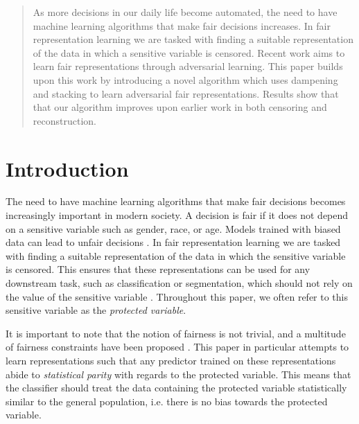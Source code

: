 \documentclass[nohyperref]{article}
\theoremstyle{plain}
\theoremstyle{definition}
\theoremstyle{remark}
\begin{document}

\printAffiliationsAndNotice{}

\begin{abstract}
As more decisions in our daily life become automated, the need  to have machine learning algorithms that make fair decisions increases. In fair representation learning we
are tasked with finding a suitable representation of the data in which a sensitive variable is censored. Recent work aims to learn fair representations through adversarial learning. This paper builds upon this work by introducing a novel algorithm which uses dampening and stacking to learn adversarial fair representations. Results show that that our algorithm improves upon earlier work in both censoring and reconstruction.
\end{abstract}
\section{Introduction}
The need to have machine learning algorithms that make fair decisions becomes increasingly important in modern society. A decision is fair if it does not depend on a sensitive variable such as gender, race, or age. Models trained with biased data can lead to unfair decisions \cite{10.1145/3457607}. In fair representation learning we are tasked with finding a suitable representation of the data in which the sensitive variable is censored. This ensures that these representations can be used for any downstream task, such as classification or segmentation, which should not rely on the value of the sensitive variable \cite{pmlr-v28-zemel13}. Throughout this paper, we often refer to this sensitive variable as the \emph{protected variable}.

It is important to note that the notion of fairness is not trivial, and a multitude of fairness constraints have been proposed \cite{10.1145/2090236.2090255}. This paper in particular attempts to learn representations such that any predictor trained on these representations abide to \emph{statistical parity} with regards to the protected variable. This means that the classifier should treat the data containing the protected variable statistically similar to the general population, i.e. there is no bias towards the protected variable.
\end{document}
